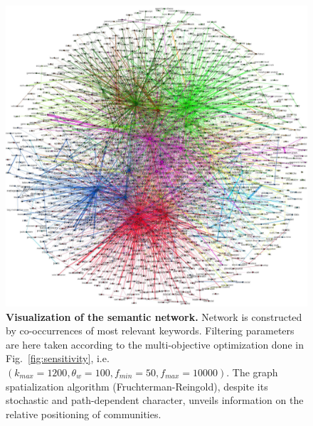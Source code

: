 \begin{figure}
\hspace{-2cm}
\includegraphics[width=1.6\textwidth]{figures/Fig7.jpg}
\caption{\textbf{Visualization of the semantic network.} Network is constructed by co-occurrences of most relevant keywords. Filtering parameters are here taken according to the multi-objective optimization done in Fig.~\ref{fig:sensitivity}, i.e. $(k_{max}=1200,\theta_w=100,f_{min}=50,f_{max}=10000)$. The graph spatialization algorithm (Fruchterman-Reingold), despite its stochastic and path-dependent character, unveils information on the relative positioning of communities.}
\label{fig:semanticnw}
\end{figure}



